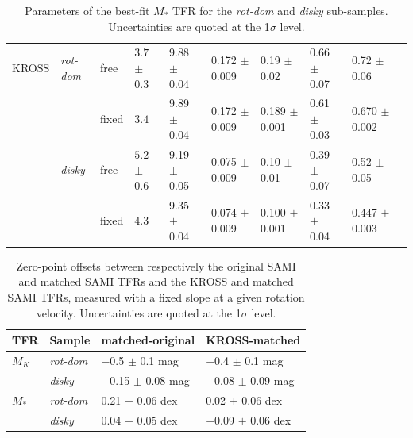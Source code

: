 \documentclass[a4paper,fleqn,usenatbib]{mnras}
\begin{document}
{\begin{table}
\begin{tabular}{ llllllllll}
KROSS  	 	   & \textit{rot-dom}     & free  & $3.7$\phantom{0} $\pm$ 0.3\phantom{0}			 & \phantom{1}9.88 $\pm$ 0.04 & 0.172 $\pm$ 0.009  					   & 0.19\phantom{0} $\pm$ 0.02\phantom{0} & 0.66 $\pm$ 0.07 					   & 0.72\phantom{0} $\pm$ 0.06 \\%
	    	   & 		       & fixed & $3.4$ \phantom{$\pm$} \phantom{0.09} 	     	 & \phantom{1}9.89 $\pm$ 0.04 & 0.172 $\pm$ 0.009  					   & 0.189 $\pm$ 0.001 					   & 0.61 $\pm$ 0.03 					   & 0.670 $\pm$ 0.002 \\%
	    	   & \textit{disky} & free  & $5.2$\phantom{0} $\pm$ 0.6\phantom{0}			 & \phantom{1}9.19 $\pm$ 0.05           & 0.075 $\pm$ 0.009  					   & 0.10\phantom{0} $\pm$ 0.01\phantom{0} & 0.39 $\pm$ 0.07 					   & 0.52\phantom{0} $\pm$ 0.05\phantom{0} \\%
	    	   & 			   & fixed & $4.3$\phantom{0} \phantom{$\pm$} \phantom{0.10} & \phantom{1}9.35 $\pm$ 0.04 & 0.074 $\pm$ 0.009  					   & 0.100 $\pm$ 0.001 					   & 0.33 $\pm$ 0.04 					   & 0.447 $\pm$ 0.003 \\%
\hline
\end{tabular}
\caption{Parameters of the best-fit $M_{*}$ TFR for the \textit{rot-dom} and \textit{disky} sub-samples. Uncertainties are quoted at the 1$\sigma$ level.}
\label{tab:SAMIvsKROSSmassTFR}
\end{table}


\begin{table}
\centering
\begin{tabular}{ llll}
\hline
TFR & Sample & matched-original  & KROSS-matched  \\
\hline
$M_{K}$ 	 & \textit{rot-dom}    & $-$0.5\phantom{0} $\pm$ 0.1\phantom{0}  mag & $-$0.4\phantom{0} $\pm$ 0.1\phantom{0} mag\\%
 			 & \textit{disky}  & $-$0.15 $\pm$ 0.08 mag & $-$0.08 $\pm$ 0.09 mag\\%
$M_{*}$ 	 & \textit{rot-dom}    & \phantom{$-$}0.21 $\pm$ 0.06 dex			& \phantom{$-$}0.02 $\pm$ 0.06 dex\\%
	    	 & \textit{disky}  & \phantom{$-$}0.04 $\pm$ 0.05 dex	& $-$0.09 $\pm$ 0.06 dex\\%
\hline
\end{tabular}
\caption{Zero-point offsets between respectively the original SAMI and matched SAMI TFRs and the KROSS and matched SAMI TFRs, measured with a fixed slope at a given rotation velocity. Uncertainties are quoted at the 1$\sigma$ level.}
\label{tab:SAMIvsKROSSoffsets}
\end{table}


}
\end{document}
